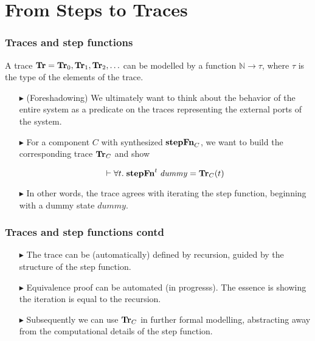 \documentclass{beamer}
\newcommand{\konst}[1]{\ensuremath{\mbox{\bf{#1}}}}
\begin{document}
\section {From Steps to Traces}

\begin{frame}\frametitle{Traces and step functions}

A trace $\konst{Tr} = \konst{Tr}_0,\konst{Tr}_1,\konst{Tr}_2, \ldots$
can be modelled by a function $\mathbb{N}\to\tau$, where $\tau$ is the
type of the elements of the trace.

\begin{itemize}
\item [$\blacktriangleright$] (Foreshadowing) We ultimately want to
  think about the behavior of the entire system as a predicate on the
  traces representing the external ports of the system.

\item [$\blacktriangleright$] For a component $C$ with synthesized $\konst{stepFn}_{C}$, we
  want to build the corresponding trace $\konst{Tr}_{C}$ and show

\[ \vdash \forall t. \; \konst{stepFn}^{t}\;\mathit{dummy} = \konst{Tr}_{C}(t) \]

\item [$\blacktriangleright$] In other words, the trace agrees with
  iterating the step function, beginning with a dummy state
  $\mathit{dummy}$.

\end{itemize}

\end{frame}


\begin{frame}\frametitle{Traces and step functions contd}

\begin{itemize}

\item [$\blacktriangleright$] The trace can be (automatically) defined
  by recursion, guided by the structure of the step function.

\item [$\blacktriangleright$] Equivalence proof can be automated (in progresss). The essence
  is showing the iteration is equal to the recursion.

\item [$\blacktriangleright$] Subsequently we can use $\konst{Tr}_{C}$ in
  further formal modelling, abstracting away from the computational
  details of the step function.

\end{itemize}

\end{frame}
\end{document}
